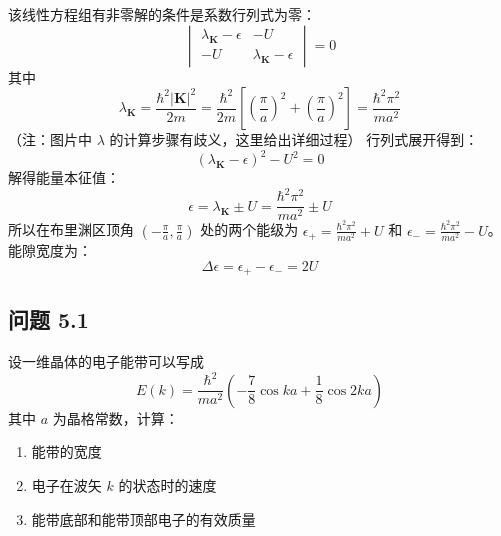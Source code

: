 \documentclass[12pt, a4paper]{article}
\newcommand{\vek}[1]{\mathbf{#1}}
\begin{document}
该线性方程组有非零解的条件是系数行列式为零：
\[
\begin{vmatrix}
\lambda_{\vek{K}} - \epsilon & -U \\
-U & \lambda_{\vek{K}} - \epsilon
\end{vmatrix} = 0
\]
其中
\[
\lambda_{\vek{K}} = \frac{\hbar^2 |\vek{K}|^2}{2m} = \frac{\hbar^2}{2m} \left[ \left(\frac{\pi}{a}\right)^2 + \left(\frac{\pi}{a}\right)^2 \right] = \frac{\hbar^2 \pi^2}{ma^2}
\]
（注：图片中 \(\lambda\) 的计算步骤有歧义，这里给出详细过程）
行列式展开得到：
\[
(\lambda_{\vek{K}} - \epsilon)^2 - U^2 = 0
\]
解得能量本征值：
\[
\epsilon = \lambda_{\vek{K}} \pm U = \frac{\hbar^2 \pi^2}{ma^2} \pm U
\]
所以在布里渊区顶角 \( (-\frac{\pi}{a}, \frac{\pi}{a}) \) 处的两个能级为 \( \epsilon_+ = \frac{\hbar^2 \pi^2}{ma^2} + U \) 和 \( \epsilon_- = \frac{\hbar^2 \pi^2}{ma^2} - U \)。
能隙宽度为：
\[
\Delta\epsilon = \epsilon_+ - \epsilon_- = 2U
\]

\subsection*{问题 5.1}
设一维晶体的电子能带可以写成
\[
E(k) = \frac{\hbar^2}{ma^2} \left( -\frac{7}{8} \cos ka + \frac{1}{8} \cos 2ka \right)
\]
其中 \(a\) 为晶格常数，计算：
\begin{enumerate}
    \item 能带的宽度
    \item 电子在波矢 \(k\) 的状态时的速度
    \item 能带底部和能带顶部电子的有效质量
\end{enumerate}
\end{document}
